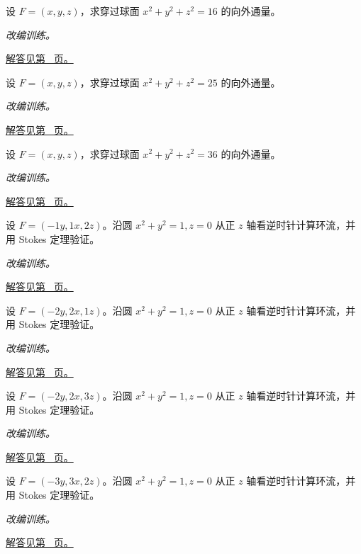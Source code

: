 \documentclass[12pt,fontset=fandol]{ctexart}
\begin{document}
\begin{example}[散度定理计算球面通量]\label{ex:c43q16}
设 $F=(x,y,z)$，求穿过球面 $x^2+y^2+z^2=16$ 的向外通量。
\par\textit{改编训练。}\par\hyperref[ans:c43q16]{解答见第~\pageref{ans:c43q16} 页。}
\end{example}
\begin{example}[散度定理计算球面通量]\label{ex:c43q17}
设 $F=(x,y,z)$，求穿过球面 $x^2+y^2+z^2=25$ 的向外通量。
\par\textit{改编训练。}\par\hyperref[ans:c43q17]{解答见第~\pageref{ans:c43q17} 页。}
\end{example}
\begin{example}[散度定理计算球面通量]\label{ex:c43q18}
设 $F=(x,y,z)$，求穿过球面 $x^2+y^2+z^2=36$ 的向外通量。
\par\textit{改编训练。}\par\hyperref[ans:c43q18]{解答见第~\pageref{ans:c43q18} 页。}
\end{example}
\begin{example}\label{ex:c43q19}
设 $F=(-1y,1x,2z)$。沿圆 $x^2+y^2=1,z=0$ 从正 $z$ 轴看逆时针计算环流，并用 Stokes 定理验证。
\par\textit{改编训练。}\par\hyperref[ans:c43q19]{解答见第~\pageref{ans:c43q19} 页。}
\end{example}
\begin{example}\label{ex:c43q20}
设 $F=(-2y,2x,1z)$。沿圆 $x^2+y^2=1,z=0$ 从正 $z$ 轴看逆时针计算环流，并用 Stokes 定理验证。
\par\textit{改编训练。}\par\hyperref[ans:c43q20]{解答见第~\pageref{ans:c43q20} 页。}
\end{example}
\begin{example}\label{ex:c43q21}
设 $F=(-2y,2x,3z)$。沿圆 $x^2+y^2=1,z=0$ 从正 $z$ 轴看逆时针计算环流，并用 Stokes 定理验证。
\par\textit{改编训练。}\par\hyperref[ans:c43q21]{解答见第~\pageref{ans:c43q21} 页。}
\end{example}
\begin{example}\label{ex:c43q22}
设 $F=(-3y,3x,2z)$。沿圆 $x^2+y^2=1,z=0$ 从正 $z$ 轴看逆时针计算环流，并用 Stokes 定理验证。
\par\textit{改编训练。}\par\hyperref[ans:c43q22]{解答见第~\pageref{ans:c43q22} 页。}
\end{example}
\end{document}
